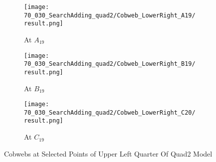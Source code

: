 \begin{figure}
    \centering
    \begin{subfigure}{0.3\textwidth}
        \centering
        \texttt{[image: 70\_030\_SearchAdding\_quad2/Cobweb\_LowerRight\_A19/result.png]}
        \caption{At $A_{19}$}
    \end{subfigure}
    \begin{subfigure}{0.3\textwidth}
        \centering
        \texttt{[image: 70\_030\_SearchAdding\_quad2/Cobweb\_LowerRight\_B19/result.png]}
        \caption{At $B_{19}$}
    \end{subfigure}
    \begin{subfigure}{0.3\textwidth}
        \centering
        \texttt{[image: 70\_030\_SearchAdding\_quad2/Cobweb\_LowerRight\_C20/result.png]}
        \caption{At $C_{19}$}
    \end{subfigure}
    \caption{Cobwebs at Selected Points of Upper Left Quarter Of Quad2 Model}
\end{figure}
